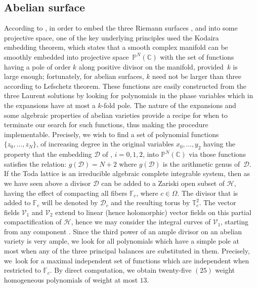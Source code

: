 \documentclass[pdftex]{sigma}
\numberwithin{equation}{section}
\begin{document}
 \subsection{Abelian surface}
 According to \cite{Dehainsala1}, in order to embed the three Riemann surfaces ,  and  into some projective space, one of the key underlying
principles used the Kodaira embedding theorem, which states that a
smooth complex manifold can be smoothly embedded into projective
space~$\mathbb{P}^{N} (\mathbb{C} )$ with the set of
functions having a pole of order $k$ along positive divisor on the
manifold, provided~$k$ is large enough; fortunately, for abelian
surfaces, $k$ need not be larger than three according to Lefschetz theorem. These functions are easily constructed from the three
Laurent solutions by looking for polynomials in the phase variables
which in the expansions have at most a $k$-fold pole. The nature of
the expansions and some algebraic properties of abelian varieties
provide a recipe for when to terminate our search for such
functions, thus making the procedure implementable. Precisely, we
wish to find a set of polynomial functions $\{z_0, \dots, z_N\}$,
of increasing degree in the original variables $x_0, \dots, y_2$
having the property that the embedding $\mathcal{D}$ of
, $i=0,1,2$, into
$\mathbb{P}^{N} (\mathbb{C} )$ via those functions
satisfies the relation: $g (\mathcal{D} ) = N + 2$ where
$g (\mathcal{D} )$ is the arithmetic genus of~$\mathcal{D}$.
If the  Toda lattice is an
irreducible algebraic complete integrable system, then as we have seen above a divisor
$\mathcal{D}$ can be added to a Zariski open subset of
$\mathcal{H}$, having the effect of compacting all fibers
$\mathbb{F}_c$, where $c \in \Omega$. The divisor that is added to
$\mathbb{F}_c$ will be denoted by $\mathcal{D}_c$ and the resulting
torus by $\mathbb{T}^2_c$. The vector fields $\mathcal{V}_1$ and
$\mathcal{V}_2$ extend to linear (hence holomorphic) vector fields
on this partial compactification of $\mathcal{H}$, hence we may
consider the integral curves of $\mathcal{V}_1$, starting from any
component . Since the third power of an ample
divisor on an abelian variety is very ample, we look for all
polynomials which have a simple pole at most when any of the three
principal balances are substituted in them. Precisely, we~look for a
maximal independent set of functions which are independent when
restricted to $\mathbb{F}_c$. By direct computation, we obtain
twenty-five $(25)$ weight homogeneous polynomials of weight at most
$13$.
\end{document}
